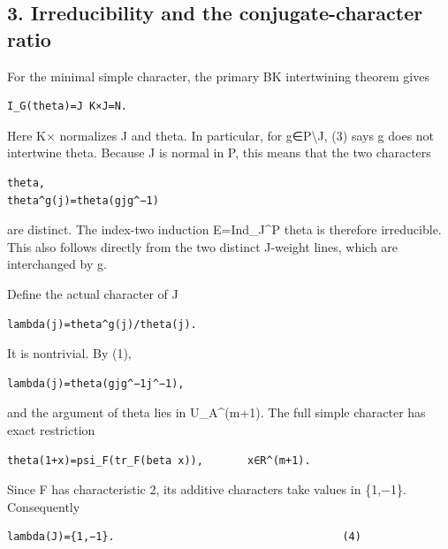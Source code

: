 \hypertarget{rank2-irreducibility-and-the-conjugate-character-ratio}{%
\subsection{3. Irreducibility and the conjugate-character
ratio}\label{rank2-irreducibility-and-the-conjugate-character-ratio}}

For the minimal simple character, the primary BK intertwining theorem
gives

\begin{Verbatim}[fontsize=\small,breaklines=true,breakanywhere=true]
I_G(theta)=J K×J=N.
\end{Verbatim}

Here K× normalizes J and theta. In particular, for g∈P\textbackslash J,
(3) says g does not intertwine theta. Because J is normal in P, this
means that the two characters

\begin{Verbatim}[fontsize=\small,breaklines=true,breakanywhere=true]
theta,
theta^g(j)=theta(gjg^−1)
\end{Verbatim}

are distinct. The index-two induction E=Ind\_J\^{}P theta is therefore
irreducible. This also follows directly from the two distinct J-weight
lines, which are interchanged by g.

Define the actual character of J

\begin{Verbatim}[fontsize=\small,breaklines=true,breakanywhere=true]
lambda(j)=theta^g(j)/theta(j).
\end{Verbatim}

It is nontrivial. By (1),

\begin{Verbatim}[fontsize=\small,breaklines=true,breakanywhere=true]
lambda(j)=theta(gjg^−1j^−1),
\end{Verbatim}

and the argument of theta lies in U\_A\^{}(m+1). The full simple
character has exact restriction

\begin{Verbatim}[fontsize=\small,breaklines=true,breakanywhere=true]
theta(1+x)=psi_F(tr_F(beta x)),       x∈R^(m+1).
\end{Verbatim}

Since F has characteristic 2, its additive characters take values in
\{1,−1\}. Consequently

\begin{Verbatim}[fontsize=\small,breaklines=true,breakanywhere=true]
lambda(J)={1,−1}.                                    (4)
\end{Verbatim}

